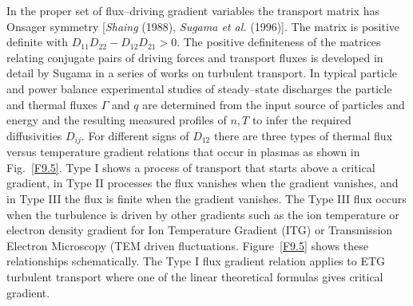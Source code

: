 \documentclass[a4paper,openany,12pt]{book}
\begin{document}
In the proper set of flux--driving gradient variables the transport matrix has Onsager symmetry [\emph{Shaing} (1988), \emph{Sugama et al.} (1996)]. The matrix is positive definite with $D_{11}D_{22}- D_{12}D_{21}>0$. The positive definiteness of the matrices relating conjugate pairs of driving forces and transport fluxes is developed in detail by Sugama in a series of works on turbulent transport. In typical particle and power balance experimental studies of steady--state discharges the particle and thermal fluxes $\Gamma$ and $q$ are determined from the input source of particles and energy and the resulting measured profiles of $n, T$ to infer the required diffusivities $D_{ij}$. For different signs of $D_{12}$ there are three types of thermal flux versus temperature gradient relations that occur in plasmas as shown in Fig.~\ref{F9.5}. Type I shows a process of transport that starts above a critical gradient, in Type II processes the flux vanishes when the gradient vanishes, and in Type III the flux is finite when the gradient vanishes. The Type III flux occurs when the turbulence is driven by other gradients such as the ion temperature or electron density gradient for Ion Temperature Gradient (ITG) or Transmission Electron Microscopy (TEM driven fluctuations. Figure~\ref{F9.5} shows these relationships schematically. The Type I flux gradient relation applies to ETG turbulent transport where one of the linear theoretical formulas gives critical gradient.
\end{document}

